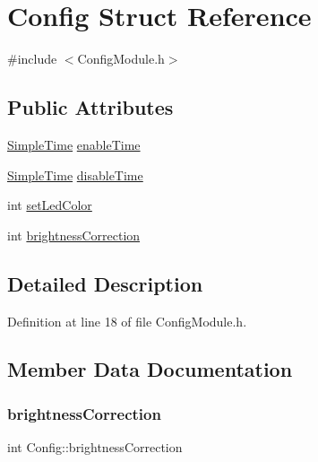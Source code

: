 \hypertarget{struct_config}{}\section{Config Struct Reference}
\label{struct_config}


{\ttfamily \#include $<$Config\+Module.\+h$>$}

\subsection*{Public Attributes}
\begin{DoxyCompactItemize}
\item 
\mbox{\hyperlink{class_simple_time}{Simple\+Time}} \mbox{\hyperlink{struct_config_ab9e6019425ef494d061ef3d82e999b51}{enable\+Time}}
\item 
\mbox{\hyperlink{class_simple_time}{Simple\+Time}} \mbox{\hyperlink{struct_config_ac16d52dba7a69c2675a7227d5e997f42}{disable\+Time}}
\item 
int \mbox{\hyperlink{struct_config_afa51e4de07b10608a065b4d1966c579c}{set\+Led\+Color}}
\item 
int \mbox{\hyperlink{struct_config_a436acc47264edf7e72102f48a15f6389}{brightness\+Correction}}
\end{DoxyCompactItemize}


\subsection{Detailed Description}


Definition at line 18 of file Config\+Module.\+h.



\subsection{Member Data Documentation}
\mbox{\label{struct_config_a436acc47264edf7e72102f48a15f6389}} 
\subsubsection{\texorpdfstring{brightnessCorrection}{brightnessCorrection}}
{\footnotesize\ttfamily int Config\+::brightness\+Correction}



